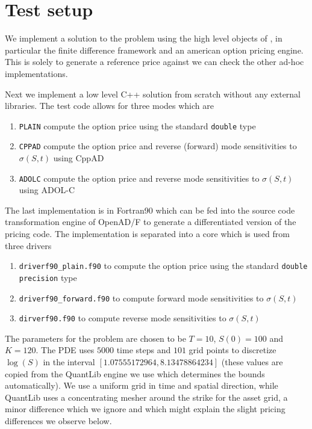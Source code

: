 \documentclass{amsart}
\theoremstyle{plain}
\numberwithin{equation}{section}
\begin{document}
\section{Test setup}

We implement a solution to the problem using the high level objects of \cite{ql}, in particular the finite difference framework and an american option pricing engine. This is solely to generate a reference price against we can check the other ad-hoc implementations.

Next we implement a low level C++ solution from scratch without any external libraries. The test code allows for three modes which are

\begin{enumerate}
\item \verb+PLAIN+ compute the option price using the standard \verb+double+ type
\item \verb+CPPAD+ compute the option price and reverse (forward) mode sensitivities to $\sigma(S,t)$ using CppAD
\item \verb+ADOLC+ compute the option price and reverse mode sensitivities to $\sigma(S,t)$ using ADOL-C
\end{enumerate}

The last implementation is in Fortran90 which can be fed into the source code transformation engine of OpenAD/F to generate a differentiated version of the pricing code. The implementation is separated into a core which is used from three drivers

\begin{enumerate}
\item \verb+driverf90_plain.f90+ to compute the option price using the standard \verb+double precision+ type
\item \verb+driverf90_forward.f90+ to compute forward mode sensitivities to $\sigma(S,t)$
\item \verb+dirverf90.f90+ to compute reverse mode sensitivities to $\sigma(S,t)$
\end{enumerate}

The parameters for the problem are chosen to be $T=10$, $S(0)=100$ and $K=120$. The PDE uses $5000$ time steps and $101$ grid points to discretize $\log(S)$ in the interval $[1.07555172964,8.13478864234]$ (these values are copied from the QuantLib engine we use which determines the bounds automatically). We use a uniform grid in time and spatial direction, while QuantLib uses a concentrating mesher around the strike for the asset grid, a minor difference which we ignore and which might explain the slight pricing differences we observe below.
\end{document}
